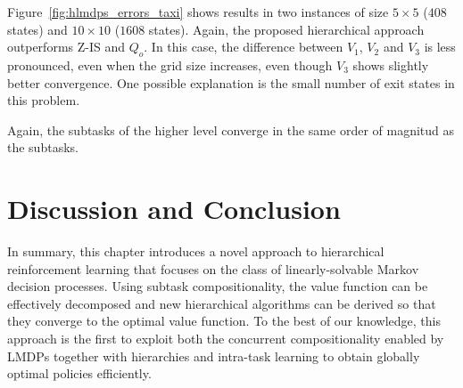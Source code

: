 Figure~\ref{fig:hlmdps_errors_taxi} shows results in two instances of size $5 \times 5$ ($408$ states) and $10 \times 10$ ($1608$ states). %
Again, the proposed hierarchical approach outperforms Z-IS and $Q_o$.
In this case, the difference between $V_1$, $V_2$ and $V_3$ is less pronounced, even when the grid size increases, even though $V_3$ shows slightly better convergence. One possible explanation is the small number of exit states in this problem.

Again, the subtasks of the higher level converge in the same order of magnitud as the subtasks.



\section{Discussion and Conclusion}

In summary, this chapter introduces a novel approach to hierarchical reinforcement learning that focuses on the class of linearly-solvable Markov decision processes.
Using subtask compositionality, the value function can be effectively decomposed and new hierarchical algorithms can be derived so that they converge to the optimal value function.
To the best of our knowledge, this approach is the first to exploit both the concurrent compositionality enabled by LMDPs together with hierarchies and intra-task learning to obtain globally optimal policies efficiently.

